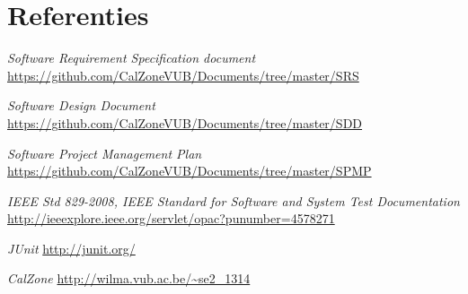 \chapter{Referenties}
\begingroup
\renewcommand{\chapter}[2]{}%
\begin{thebibliography}{99}

     \emph{Software Requirement Specification document} \url{https://github.com/CalZoneVUB/Documents/tree/master/SRS}
    
     \emph{Software Design Document} \url{https://github.com/CalZoneVUB/Documents/tree/master/SDD}
    
     \emph{Software Project Management Plan} \url{https://github.com/CalZoneVUB/Documents/tree/master/SPMP}
    
     \emph{IEEE Std 829-2008\texttrademark \space, IEEE Standard for Software and System Test Documentation} \url{http://ieeexplore.ieee.org/servlet/opac?punumber=4578271}
    
     \emph{JUnit} \url{http://junit.org/}
    
     \emph{CalZone} \url{http://wilma.vub.ac.be/~se2_1314}

\end{thebibliography}

\endgroup